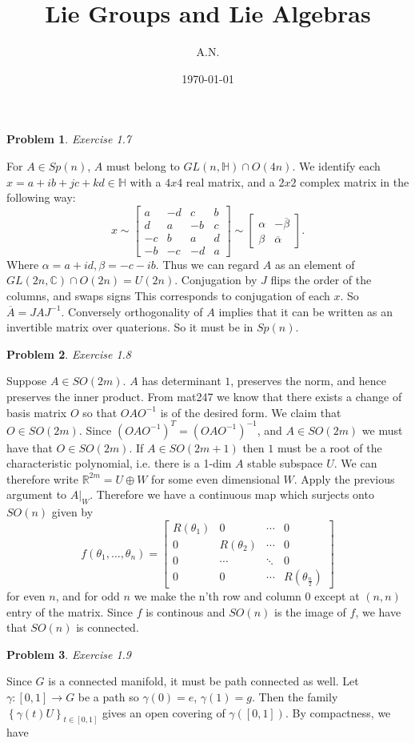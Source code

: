 \documentclass[12pt, a4paper]{article}
\title{Lie Groups and Lie Algebras}
\author{A.N.}
\date{\today}
\newtheorem{problem}{Problem}
\theoremstyle{definition}
\newcommand{\R}{\mathbb{R}}                           %
\newcommand{\C}{\mathbb{C}}                           %
\newcommand{\ol}{\overline}
\newcommand{\bmat}[1]{\begin{bmatrix}#1\end{bmatrix}}
\begin{document}
	\maketitle
	\newpage
	\begin{problem}
		Exercise 1.7
\end{problem} For $A\in Sp(n)$, $A$ must belong to $GL(n, \mathbb{H}) \cap O(4n)$. We identify each $x= a+ ib+jc+kd\in \mathbb{H}$ with a $4x4$ real matrix, and a $2x2$ complex matrix in the following way: 
$$x \sim \bmat{a & -d &c & b \\ d&a&-b&c \\ -c&b&a&d \\ -b & -c & -d & a} \sim \bmat{\alpha & - \ol{\beta} \\ \beta& \ol{\alpha}}. $$ Where $\alpha = a+ id, \beta = -c- i b$. Thus we can regard $A$ as an element of $GL(2n, \C)\cap O(2n) = U(2n)$. Conjugation by $J$ flips the order of the columns, and swaps signs This corresponds to conjugation of each $x$. So $\overline{A} = JAJ^{-1}$. Conversely orthogonality of $A$ implies that it can be written as an invertible matrix over quaterions. So it must be in $Sp(n)$. 
\begin{problem}
Exercise 1.8
\end{problem}
Suppose $A\in SO(2m)$. $A$ has determinant $1$, preserves the norm, and hence preserves the inner product. From mat247 we know that there exists a change of basis matrix $O$ so that $OAO^{-1}$ is of the desired form. We claim that $O\in SO(2m)$. Since $\left(OAO^{-1}\right)^T  = \left(OAO^{-1}\right)^{-1}$, and $A\in SO(2m)$ we must have that $O\in SO(2m)$. If $A\in SO(2m+1)$ then $1$ must be a root of the characteristic polynomial, i.e. there is a 1-dim $A$ stable subspace $U$. We can therefore write $\R^{2m} = U\oplus W$ for some even dimensional $W$. Apply the previous argument to $A|_W$. Therefore we have a continuous map which surjects onto $SO(n)$ given by $$f(\theta_1, \dots, \theta_n) = \bmat{R(\theta_1) & 0 & \cdots & 0  \\ 0 & R(\theta_2) &\cdots & 0 \\ 0 & \cdots & \ddots & 0 \\ 0 & 0 & \cdots &  R(\theta_\frac{n}{2}) }$$ for even $n$, and for odd $n$ we make the n'th row and column $0$ except at $(n,n)$ entry of the matrix. Since $f$ is continous and $SO(n)$ is the image of $f$, we have that $SO(n)$ is connected. 
\begin{problem}
	Exercise 1.9
\end{problem}
Since $G$ is a connected manifold, it must be path connected as well. Let $\gamma: [0,1] \to G$ be a path so $\gamma(0)=e$, $\gamma(1)=g$. Then the family $\left\{\gamma(t)U \right\}_{t\in [0,1]}$ gives an open covering of $\gamma([0,1])$. By compactness, we have
\end{document}
